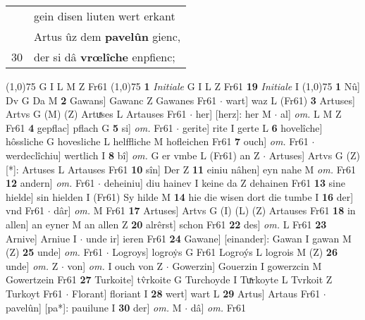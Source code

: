 \documentclass[8pt,a4paper,notitlepage]{article}
\begin{document}
\begin{table}[ht]
\begin{minipage}[t]{0.5\linewidth}
\begin{tabular}{rl}
 & gein disen liuten wert erkant\\ 
 & Artus ûz dem \textbf{pavelûn} gienc,\\ 
30 & der si dâ \textbf{vrœlîche} enpfienc;\\ 
\end{tabular}
\scriptsize
\line(1,0){75} \newline
G I L M Z Fr61 \newline
\line(1,0){75} \newline
\textbf{1} \textit{Initiale} G I L Z Fr61  \textbf{19} \textit{Initiale} I  \newline
\line(1,0){75} \newline
\textbf{1} Nû] Dv G Da M \textbf{2} Gawans] Gawanc Z Gawanes Fr61  $\cdot$ wart] waz L (Fr61) \textbf{3} Artuses] Artvs G (M) (Z) Artuͯses L Artauses Fr61  $\cdot$ her] [herz]: her M  $\cdot$ al] \textit{om.} L M Z Fr61 \textbf{4} gepflac] pflach G \textbf{5} si] \textit{om.} Fr61  $\cdot$ gerite] rite I gerte L \textbf{6} hovelîche] hôssliche G hovesliche L helffliche M hofleichen Fr61 \textbf{7} ouch] \textit{om.} Fr61  $\cdot$ werdeclîchiu] wertlich I \textbf{8} bî] \textit{om.} G er vmbe L (Fr61) an Z  $\cdot$ Artuses] Artvs G (Z) [*]: Artuses  L Artauses Fr61 \textbf{10} sîn] Der Z \textbf{11} einiu nâhen] eyn nahe M \textit{om.} Fr61 \textbf{12} andern] \textit{om.} Fr61  $\cdot$ deheiniu] diu hainev I keine da Z dehainen Fr61 \textbf{13} sine hielde] sin hielden I (Fr61) Sy hilde M \textbf{14} hie die wisen dort die tumbe I \textbf{16} der] vnd Fr61  $\cdot$ dâr] \textit{om.} M Fr61 \textbf{17} Artuses] Artvs G (I) (L) (Z) Artauses Fr61 \textbf{18} in allen] an eyner M an allen Z \textbf{20} alrêrst] schon Fr61 \textbf{22} des] \textit{om.} L Fr61 \textbf{23} Arnive] Arniue I  $\cdot$ unde ir] ieren Fr61 \textbf{24} Gawane] [einander]: Gawan I gawan M (Z) \textbf{25} unde] \textit{om.} Fr61  $\cdot$ Logroys] logroẏs G Fr61 Logroýs L logrois M (Z) \textbf{26} unde] \textit{om.} Z  $\cdot$ von] \textit{om.} I ouch von Z  $\cdot$ Gowerzin] Gouerzin I gowerzcin M Gowertzein Fr61 \textbf{27} Turkoite] tv̂rkoite G Turchoyde I Tuͯrkoyte L Tvrkoit Z Turkoyt Fr61  $\cdot$ Florant] floriant I \textbf{28} wert] wart L \textbf{29} Artus] Artaus Fr61  $\cdot$ pavelûn] [pa*]: pauilune I \textbf{30} der] \textit{om.} M  $\cdot$ dâ] \textit{om.} Fr61 \newline
\end{minipage}
\hspace{0.5cm}
\begin{minipage}[t]{0.5\linewidth}
\small

\end{minipage}
\end{table}
\end{document}
